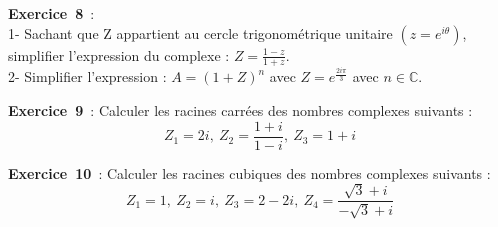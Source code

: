 \documentclass[12pt, a4paper]{article}
\begin{document}
{\bf Exercice~8}~:\\ 1- Sachant que Z appartient au cercle trigonométrique unitaire $(z = e^{i\theta})$, simplifier l'expression du complexe : $Z = \frac{1-z}{1+z}$.
\\
2- Simplifier l'expression : $A = (1+Z)^n$ avec $Z=e^\frac{2i\pi}{3}$ avec $n\in\mathbb{C}$.

{\bf Exercice~9}~: Calculer les racines carrées des nombres complexes suivants :
\begin{equation*}
Z_{1}=2i,~Z_{2}=\frac{1+i}{1-i},~Z_{3}=1+i
\end{equation*}

{\bf Exercice~10}~: Calculer les racines cubiques des nombres complexes suivants :
\begin{equation*}
Z_{1}=1,~Z_{2}=i,~Z_{3}=2-2i,~Z_{4}=\frac{\sqrt{3}+i}{-\sqrt{3}+i}
\end{equation*}
\end{document}
